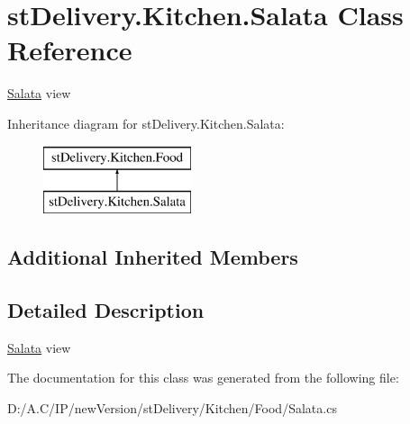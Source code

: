\hypertarget{classst_delivery_1_1_kitchen_1_1_salata}{}\section{st\+Delivery.\+Kitchen.\+Salata Class Reference}
\label{classst_delivery_1_1_kitchen_1_1_salata}


\hyperlink{classst_delivery_1_1_kitchen_1_1_salata}{Salata} view  


Inheritance diagram for st\+Delivery.\+Kitchen.\+Salata\+:\begin{figure}[H]
\begin{center}
\leavevmode
\includegraphics[height=2.000000cm]{classst_delivery_1_1_kitchen_1_1_salata}
\end{center}
\end{figure}
\subsection*{Additional Inherited Members}


\subsection{Detailed Description}
\hyperlink{classst_delivery_1_1_kitchen_1_1_salata}{Salata} view 



The documentation for this class was generated from the following file\+:\begin{DoxyCompactItemize}
\item 
D\+:/\+A.\+C/\+I\+P/new\+Version/st\+Delivery/\+Kitchen/\+Food/Salata.\+cs\end{DoxyCompactItemize}
